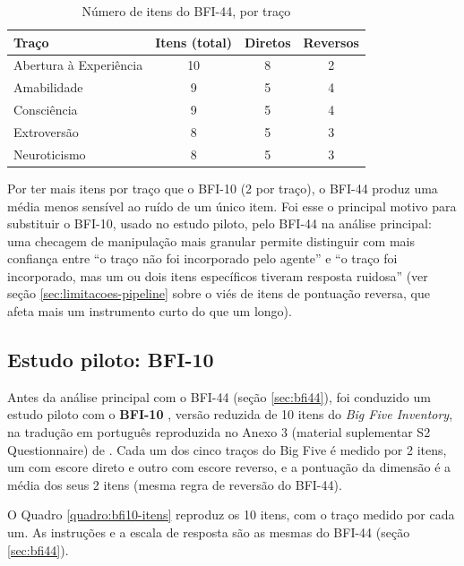 \begin{table}[htb]
    \caption{Número de itens do BFI-44, por traço}
    \label{tab:bfi44-resumo}
    \centering
    \begin{tabular}{lccc}
        \toprule
        Traço & Itens (total) & Diretos & Reversos \\
        \midrule
        Abertura à Experiência & 10 & 8 & 2 \\
        Amabilidade             & 9  & 5 & 4 \\
        Consciência             & 9  & 5 & 4 \\
        Extroversão             & 8  & 5 & 3 \\
        Neuroticismo            & 8  & 5 & 3 \\
        \bottomrule
    \end{tabular}
\end{table}

Por ter mais itens por traço que o BFI-10 (2 por traço), o BFI-44 produz
uma média menos sensível ao ruído de um único item. Foi esse o principal
motivo para substituir o BFI-10, usado no estudo piloto, pelo BFI-44 na
análise principal: uma checagem de manipulação mais granular permite
distinguir com mais confiança entre ``o traço não foi incorporado pelo
agente'' e ``o traço foi incorporado, mas um ou dois itens específicos tiveram
resposta ruidosa'' (ver seção \ref{sec:limitacoes-pipeline} sobre o viés de
itens de pontuação reversa, que afeta mais um instrumento curto do que
um longo).

\subsection{Estudo piloto: BFI-10}
\label{sec:bfi10-piloto}

Antes da análise principal com o BFI-44 (seção \ref{sec:bfi44}), foi
conduzido um estudo piloto com o \textbf{BFI-10} \cite{rammstedtjohn2007},
versão reduzida de 10 itens do \textit{Big Five Inventory}, na tradução
em português reproduzida no Anexo 3 (material suplementar S2
Questionnaire) de . Cada um dos cinco traços do Big Five
é medido por 2 itens, um com escore direto e outro com escore reverso, e
a pontuação da dimensão é a média dos seus 2 itens (mesma regra de
reversão do BFI-44).

O Quadro \ref{quadro:bfi10-itens} reproduz os 10 itens, com o traço
medido por cada um. As instruções e a escala de resposta são as mesmas
do BFI-44 (seção \ref{sec:bfi44}).

